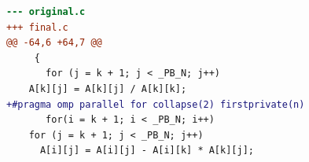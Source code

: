 \begin{lstlisting}[language=diff,basicstyle=\ttfamily\scriptsize,breaklines=true,caption={polybench/lu — FASTER (e10)}]
--- original.c
+++ final.c
@@ -64,6 +64,7 @@
     {
       for (j = k + 1; j < _PB_N; j++)
 	A[k][j] = A[k][j] / A[k][k];
+#pragma omp parallel for collapse(2) firstprivate(n)
       for(i = k + 1; i < _PB_N; i++)
 	for (j = k + 1; j < _PB_N; j++)
 	  A[i][j] = A[i][j] - A[i][k] * A[k][j];
\end{lstlisting}
